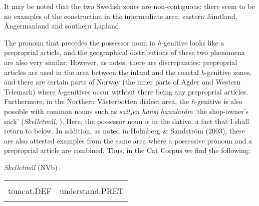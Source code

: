 \begin{styleBodyTextFirst}
It may be noted that the two Swedish zones are non-contiguous: there seem to be no examples of the construction in the intermediate area: eastern Jämtland, Ångermanland and southern Lapland. 

\end{styleBodyTextFirst}

\begin{styleBodytextC}
The pronoun that precedes the possessor noun in \textit{h-}genitive looks like a preproprial article, and the geographical distributions of these two phenomena are also very similar. However, as \citet[67]{Delsing2003b} notes, there are discrepancies: preproprial articles are used in the area between the inland and the coastal \textit{h}{}-genitive zones, and there are certain parts of Norway (the inner parts of Agder and Western Telemark) where \textit{h-}genitives occur without there being any preproprial articles. Furthermore, in the Northern Västerbotten dialect area, the \textit{h-}genitive is also possible with common nouns such as \textit{saitjen hansj hannlaråm} ‘the shop-owner’s sack’ (\textit{Skelletmål}, \citet[23]{Marklund1976}). Here, the possessor noun is in the dative, a fact that I shall return to below. In addition, as noted in Holmberg \& Sandström (2003), there are also attested examples from the same area where a possessive pronoun and a preproprial article are combined. Thus, in the Cat Corpus we find the following:

\end{styleBodytextC}


\begin{listWWNumileveli}
\item {}

\begin{styleExample}
\textit{Skelletmål} (NVb)

\end{styleExample}

\end{listWWNumileveli}

\begin{tabular}{ll}
\lsptoprule
\multicolumn{2}{l}{Kattkalln

}\\
tomcat.DEF & understand.PRET\\
\lspbottomrule
\end{tabular}

